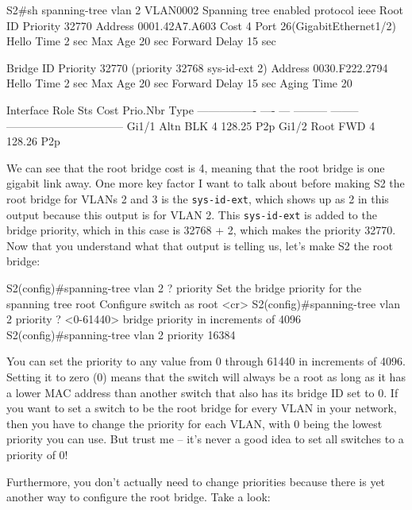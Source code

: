 \begin{cli}
S2#sh spanning-tree vlan 2
VLAN0002
  Spanning tree enabled protocol ieee
  Root ID    Priority    32770
             Address     0001.42A7.A603
             Cost        4
             Port        26(GigabitEthernet1/2)
             Hello Time  2 sec  Max Age 20 sec  Forward Delay 15 sec
 
  Bridge ID  Priority    32770  (priority 32768 sys-id-ext 2)
             Address     0030.F222.2794
             Hello Time  2 sec  Max Age 20 sec  Forward Delay 15 sec
             Aging Time  20
 
Interface        Role Sts Cost      Prio.Nbr Type
---------------- ---- --- --------- -------- --------------------------------
Gi1/1            Altn BLK 4         128.25   P2p
Gi1/2            Root FWD 4         128.26   P2p
\end{cli}

We can see that the root bridge cost is 4, meaning that the root bridge
is one gigabit link away. One more key factor I want to talk about
before making S2 the root bridge for VLANs 2 and 3 is the
\texttt{sys-id-ext}, which shows up as 2 in this output because this
output is for VLAN 2. This \texttt{sys-id-ext} is added to the bridge
priority, which in this case is 32768 + 2, which makes the priority
32770. Now that you understand what that output is telling us, let's
make S2 the root bridge:

\begin{cli}
S2(config)#spanning-tree vlan 2 ?
  priority  Set the bridge priority for the spanning tree
  root      Configure switch as root
  <cr>
S2(config)#spanning-tree vlan 2 priority ?
  <0-61440>  bridge priority in increments of 4096
S2(config)#spanning-tree vlan 2 priority 16384
\end{cli}

You can set the priority to any value from 0 through 61440 in increments
of 4096. Setting it to zero (0) means that the switch will always be a
root as long as it has a lower MAC address than another switch that also
has its bridge ID set to 0. If you want to set a switch to be the root
bridge for every VLAN in your network, then you have to change the
priority for each VLAN, with 0 being the lowest priority you can use.
But trust me -- it's never a good idea to set all switches to a priority
of 0!

Furthermore, you don't actually need to change priorities because there
is yet another way to configure the root bridge. Take a look:


